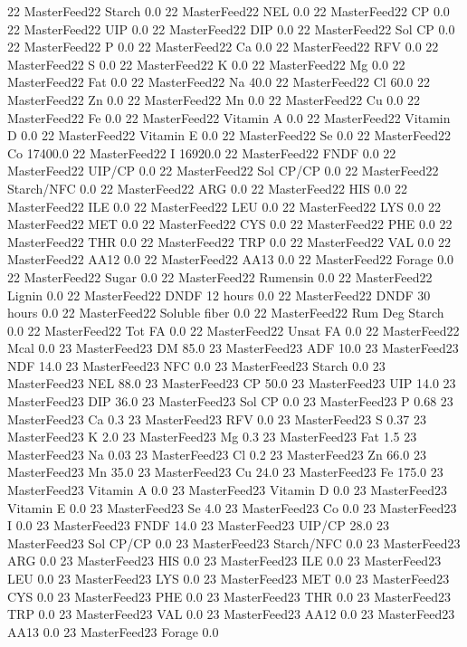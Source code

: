 \documentclass[letterpaper,10pt,english]{sphinxmanual}
\begin{document}
\begin{sphinxVerbatim}[commandchars=\\\{\},numbers=left,firstnumber=1,stepnumber=1]
22 MasterFeed22 Starch 0.0
22 MasterFeed22 NEL 0.0
22 MasterFeed22 CP 0.0
22 MasterFeed22 UIP 0.0
22 MasterFeed22 DIP 0.0
22 MasterFeed22 Sol CP 0.0
22 MasterFeed22 P 0.0
22 MasterFeed22 Ca 0.0
22 MasterFeed22 RFV 0.0
22 MasterFeed22 S 0.0
22 MasterFeed22 K 0.0
22 MasterFeed22 Mg 0.0
22 MasterFeed22 Fat 0.0
22 MasterFeed22 Na 40.0
22 MasterFeed22 Cl 60.0
22 MasterFeed22 Zn 0.0
22 MasterFeed22 Mn 0.0
22 MasterFeed22 Cu 0.0
22 MasterFeed22 Fe 0.0
22 MasterFeed22 Vitamin A 0.0
22 MasterFeed22 Vitamin D 0.0
22 MasterFeed22 Vitamin E 0.0
22 MasterFeed22 Se 0.0
22 MasterFeed22 Co 17400.0
22 MasterFeed22 I 16920.0
22 MasterFeed22 FNDF 0.0
22 MasterFeed22 UIP/CP 0.0
22 MasterFeed22 Sol CP/CP 0.0
22 MasterFeed22 Starch/NFC 0.0
22 MasterFeed22 ARG 0.0
22 MasterFeed22 HIS 0.0
22 MasterFeed22 ILE 0.0
22 MasterFeed22 LEU 0.0
22 MasterFeed22 LYS 0.0
22 MasterFeed22 MET 0.0
22 MasterFeed22 CYS 0.0
22 MasterFeed22 PHE 0.0
22 MasterFeed22 THR 0.0
22 MasterFeed22 TRP 0.0
22 MasterFeed22 VAL 0.0
22 MasterFeed22 AA\PYGZsh{}12 0.0
22 MasterFeed22 AA\PYGZsh{}13 0.0
22 MasterFeed22 \PYGZpc{} Forage 0.0
22 MasterFeed22 Sugar \PYGZpc{} 0.0
22 MasterFeed22 Rumensin 0.0
22 MasterFeed22 Lignin 0.0
22 MasterFeed22 DNDF 12 hours 0.0
22 MasterFeed22 DNDF 30 hours 0.0
22 MasterFeed22 Soluble fiber 0.0
22 MasterFeed22 Rum Deg Starch 0.0
22 MasterFeed22 Tot FA 0.0
22 MasterFeed22 Unsat FA 0.0
22 MasterFeed22 Mcal 0.0
23 MasterFeed23 DM 85.0
23 MasterFeed23 ADF 10.0
23 MasterFeed23 NDF 14.0
23 MasterFeed23 NFC 0.0
23 MasterFeed23 Starch 0.0
23 MasterFeed23 NEL 88.0
23 MasterFeed23 CP 50.0
23 MasterFeed23 UIP 14.0
23 MasterFeed23 DIP 36.0
23 MasterFeed23 Sol CP 0.0
23 MasterFeed23 P 0.68
23 MasterFeed23 Ca 0.3
23 MasterFeed23 RFV 0.0
23 MasterFeed23 S 0.37
23 MasterFeed23 K 2.0
23 MasterFeed23 Mg 0.3
23 MasterFeed23 Fat 1.5
23 MasterFeed23 Na 0.03
23 MasterFeed23 Cl 0.2
23 MasterFeed23 Zn 66.0
23 MasterFeed23 Mn 35.0
23 MasterFeed23 Cu 24.0
23 MasterFeed23 Fe 175.0
23 MasterFeed23 Vitamin A 0.0
23 MasterFeed23 Vitamin D 0.0
23 MasterFeed23 Vitamin E 0.0
23 MasterFeed23 Se 4.0
23 MasterFeed23 Co 0.0
23 MasterFeed23 I 0.0
23 MasterFeed23 FNDF 14.0
23 MasterFeed23 UIP/CP 28.0
23 MasterFeed23 Sol CP/CP 0.0
23 MasterFeed23 Starch/NFC 0.0
23 MasterFeed23 ARG 0.0
23 MasterFeed23 HIS 0.0
23 MasterFeed23 ILE 0.0
23 MasterFeed23 LEU 0.0
23 MasterFeed23 LYS 0.0
23 MasterFeed23 MET 0.0
23 MasterFeed23 CYS 0.0
23 MasterFeed23 PHE 0.0
23 MasterFeed23 THR 0.0
23 MasterFeed23 TRP 0.0
23 MasterFeed23 VAL 0.0
23 MasterFeed23 AA\PYGZsh{}12 0.0
23 MasterFeed23 AA\PYGZsh{}13 0.0
23 MasterFeed23 \PYGZpc{} Forage 0.0

\end{sphinxVerbatim}
\end{document}
